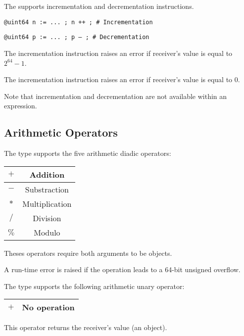 The  supports incrementation and decrementation instructions.

\texttt{@uint64 n := ... ; n ++ ; \# Incrementation}

\texttt{@uint64 p := ... ; p -- ; \# Decrementation}\newline

The incrementation instruction raises an error if receiver's value is equal to $2^{64}-1$.\newline

The incrementation instruction raises an error if receiver's value is equal to 0.\newline

Note that incrementation and decrementation are not available within an expression.




\subsection{Arithmetic Operators}

The  type supports the five arithmetic diadic operators:\newline

\begin{tabular}{|c|c|}
\hline
$+$ & Addition \\
\hline
$-$ & Substraction \\
\hline
$*$ & Multiplication \\
\hline
$/$ & Division \\
\hline
$\%$ & Modulo \\
\hline
\end{tabular}

Theses operators require both arguments to be  objects.\newline

A run-time error is raised if the operation leads to a 64-bit unsigned overflow.

The  type supports the following arithmetic unary operator:\newline

\begin{tabular}{|c|c|}
\hline
$+$ & No operation \\
\hline
\end{tabular}

This operator returns the receiver's value (an   object).




